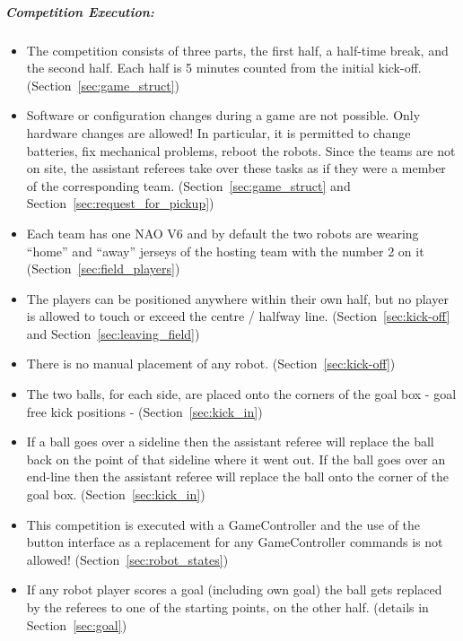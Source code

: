 \subparagraph{Competition Execution:}
\begin{itemize}
	\item The competition consists of three parts, the first half, a half-time break, and the second half. Each half is 5 minutes counted from the initial kick-off. (\cf Section~\ref{sec:game_struct})
	
	\item Software or configuration changes during a game are not possible. Only hardware changes are allowed! In particular, it is permitted to change batteries, fix mechanical problems, reboot the robots. Since the teams are not on site, the assistant referees take over these tasks as if they were a member of the corresponding team. (\cf Section~\ref{sec:game_struct} and Section~\ref{sec:request_for_pickup})
	
	\item Each team has one NAO V6 and by default the two robots are wearing ``home'' and ``away'' jerseys of the hosting team with the number 2 on it (\cf Section~\ref{sec:field_players})
	
	\item The players can be positioned anywhere within their own half, but no player is allowed to touch or exceed the centre / halfway line. (\cf Section~\ref{sec:kick-off} and Section~\ref{sec:leaving_field})
	
	\item There is no manual placement of any robot. (\cf Section~\ref{sec:kick-off})
	
	\item The two balls, for each side, are placed onto the corners of the goal box - goal free kick positions - (\cf Section~\ref{sec:kick_in})
	
	\item If a ball goes over a sideline then the assistant referee will replace the ball back on the point of that sideline where it went out. If the ball goes over an end-line then the assistant referee will replace the ball onto the corner of the goal box. (\cf Section~\ref{sec:kick_in})
	
	\item This competition is executed with a GameController and the use of the button interface as a replacement for any GameController commands is not allowed! (\cf Section~\ref{sec:robot_states})
	
	\item If any robot player scores a goal (including own goal) the ball gets replaced by the referees to one of the starting points, on the other half. (\cf details in Section~\ref{sec:goal})
	

\end{itemize}
